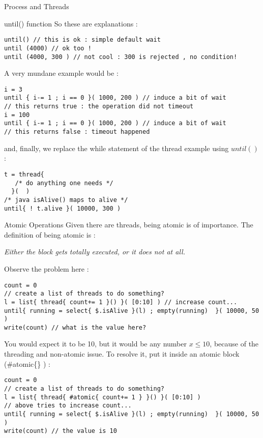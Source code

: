 \begin{section}{Process and Threads}
\begin{subsection}{until() function}
So these are explanations :

\begin{lstlisting}[style=JexlStyle]
until() // this is ok : simple default wait  
until (4000) // ok too !
until (4000, 300 ) // not cool : 300 is rejected , no condition!
\end{lstlisting}       

A very mundane example would be :

\begin{lstlisting}[style=JexlStyle]
i = 3 
until { i-= 1 ; i == 0 }( 1000, 200 ) // induce a bit of wait 
// this returns true : the operation did not timeout 
i = 100 
until { i-= 1 ; i == 0 }( 1000, 200 ) // induce a bit of wait 
// this returns false : timeout happened  
\end{lstlisting}       

and, finally, we replace the while statement 
of the thread example using $until()$ :

\begin{lstlisting}[style=JexlStyle]
t = thread{  
   /* do anything one needs */
  }(  )
/* java isAlive() maps to alive */
until{ ! t.alive }( 10000, 300 )
\end{lstlisting}
\end{subsection}

\begin{subsection}{Atomic Operations}
Given there are threads, being atomic is of importance.
The definition of being atomic is :
\begin{center}\emph{Either the block gets totally executed, or it does not at all. }\end{center}
Observe the problem here :

\begin{lstlisting}[style=JexlStyle]
count = 0 
// create a list of threads to do something?
l = list{ thread{ count+= 1 }() }( [0:10] ) // increase count...
until{ running = select{ $.isAlive }(l) ; empty(running)  }( 10000, 50 )
write(count) // what is the value here?
\end{lstlisting}

You would expect it to be 10, but it would be any number $x \le 10$,
because of the threading and non-atomic issue. To resolve it, 
put it inside an atomic block (\#atomic\{\} ) : 

\begin{center}\begin{minipage}{\linewidth}
\begin{lstlisting}[style=JexlStyle]
count = 0 
// create a list of threads to do something?
l = list{ thread{ #atomic{ count+= 1 } }() }( [0:10] ) 
// above tries to increase count...
until{ running = select{ $.isAlive }(l) ; empty(running)  }( 10000, 50 )
write(count) // the value is 10
\end{lstlisting}
\end{minipage}\end{center}


\end{subsection}
\end{section}
